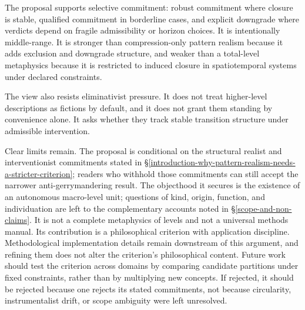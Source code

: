 The proposal supports selective commitment: robust commitment where
closure is stable, qualified commitment in borderline cases, and
explicit downgrade where verdicts depend on fragile admissibility or
horizon choices. It is intentionally middle-range. It is stronger than
compression-only pattern realism because it adds exclusion and
downgrade structure, and weaker than a total-level metaphysics because
it is restricted to induced closure in spatiotemporal systems under
declared constraints.

The view also resists eliminativist pressure. It does not treat
higher-level descriptions as fictions by default, and it does not grant
them standing by convenience alone. It asks whether they track stable
transition structure under admissible intervention.

Clear limits remain. The proposal is conditional on the structural
realist and interventionist commitments stated in
\S\ref{introduction-why-pattern-realism-needs-a-stricter-criterion};
readers who withhold those commitments can still accept the narrower
anti-gerrymandering result. The objecthood it secures is the existence
of an autonomous macro-level unit; questions of kind, origin, function,
and individuation are left to the complementary accounts noted in
\S\ref{scope-and-non-claims}. It is not a complete metaphysics of
levels and not a universal methods manual. Its contribution is a
philosophical criterion with application discipline. Methodological
implementation details remain downstream of this argument, and refining
them does not alter the criterion's philosophical content. Future work should
test the criterion across domains by comparing candidate partitions
under fixed constraints, rather than by multiplying new concepts. If
rejected, it should be rejected because one rejects its stated
commitments, not because circularity, instrumentalist drift, or scope
ambiguity were left unresolved.

\backmatter

\label{references}
